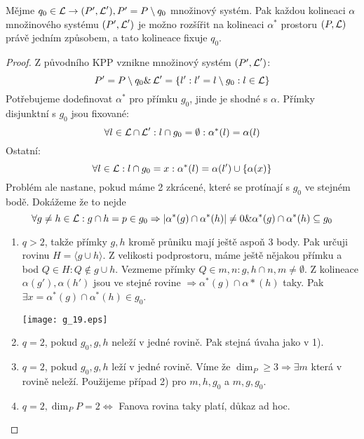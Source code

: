 \begin{lemma}\label{kpp:extension}
    Mějme $q_0\in\operatorname{\mathcal{L}}\rightarrow (P',\operatorname{\mathcal{L}}'), P' = P\setminus q_0$ množinový systém.
    Pak každou kolineaci $\alpha$ množinového systému $(P',\operatorname{\mathcal{L}}')$ je možno rozšířit na kolineaci $\alpha^*$ prostoru $(P, \operatorname{\mathcal{L}})$ právě jedním způsobem, a tato kolineace fixuje $q_0$.
\end{lemma}
\begin{proof}
	Z původního KPP vznikne množinový systém $(P',\operatorname{\mathcal{L}}')$:
	\[ P' = P\setminus q_0 \& \operatorname{\mathcal{L}}' = \{ l': l' = l \setminus g_0: l \in \operatorname{\mathcal{L}} \} \]
	Potřebujeme dodefinovat $\alpha^*$ pro přímku $g_0$, jinde je shodné s $\alpha$.
	Přímky disjunktní s $g_0$ jsou fixované:
	\[ \forall l \in \operatorname{\mathcal{L}} \cap \operatorname{\mathcal{L}}': l \cap g_0 = \emptyset: \alpha^*(l) = \alpha(l) \]
	Ostatní:
	\[ \forall l \in \operatorname{\mathcal{L}}: l \cap g_0 = x: \alpha^*(l) = \alpha(l') \cup \{ \alpha(x) \} \]
	Problém ale nastane, pokud máme 2 zkrácené, které se protínají s $g_0$ ve stejném bodě.
	Dokážeme že to nejde
	\[ \forall g \ne h \in \operatorname{\mathcal{L}}: g \cap h = p \in g_0 \Rightarrow |\alpha^*(g) \cap \alpha^*(h)| \ne 0 \& \alpha^*(g) \cap \alpha^*(h) \subseteq g_0 \]
    \begin{enumerate}
	    \item $q > 2$, takže přímky $g, h$ kromě průniku mají ještě aspoň 3 body.
		    Pak určuji rovinu $H = \langle g \cup h \rangle$.
		    Z velikosti podprostoru, máme ještě nějakou přímku a bod $Q \in H: Q \notin g \cup h$.
		    Vezmeme přímky $Q \in m, n: g,h \cap n,m \ne \emptyset$.
		    Z kolineace $\alpha(g'), \alpha(h')$ jsou ve stejné rovine $\Rightarrow \alpha^*(g) \cap \alpha*(h)$ taky.
		    Pak $\exists x = \alpha^*(g) \cap \alpha^*(h) \in g_0$.

    	\texttt{[image: g\_19.eps]}

	\item $q = 2$, pokud $g_0, g, h$ neleží v jedné rovině.
		Pak stejná úvaha jako v 1).

	\item $q = 2$, pokud $g_0, g, h$ leží v jedné rovině.
		Víme že $\dim_P \geq 3 \Rightarrow \exists m$ která v rovině neleží.
		Použijeme případ 2) pro $m, h, g_0$ a $m, g, g_0$.
	\item $q = 2, \dim_P P = 2 \iff$ Fanova rovina taky platí, důkaz ad hoc.
    \end{enumerate}
\end{proof}

